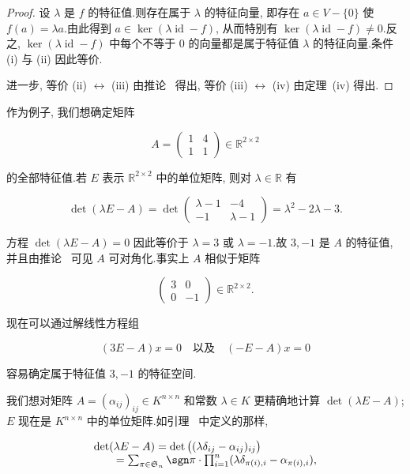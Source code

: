 \begin{proof}
设 $\lambda$ 是 $f$ 的特征值.则存在属于 $\lambda$ 的特征向量, 即存在 $a \in V - \{0\}$ 使 $f(a) = \lambda a$.由此得到 $a \in \ker(\lambda \operatorname{id} - f)$, 从而特别有 $\ker(\lambda \operatorname{id} - f) \neq 0$.反之, $\ker(\lambda \operatorname{id} - f)$ 中每个不等于 $0$ 的向量都是属于特征值 $\lambda$ 的特征向量.条件 (i) 与 (ii) 因此等价.

进一步, 等价 (ii) $\longleftrightarrow$ (iii) 由推论~ 得出, 等价 (iii) $\longleftrightarrow$ (iv) 由定理~(iv) 得出.
\end{proof}

作为例子, 我们想确定矩阵

\[
A = \left(\begin{array}{cc} 1 & 4 \\ 1 & 1 \end{array}\right) \in \mathbb{R}^{2 \times 2}\]

的全部特征值.若 $E$ 表示 $\mathbb{R}^{2 \times 2}$ 中的单位矩阵, 则对 $\lambda \in \mathbb{R}$ 有

\[
\det(\lambda E - A) = \det\left(\begin{array}{cc} \lambda - 1 & -4 \\ -1 & \lambda - 1 \end{array}\right) = \lambda^2 - 2\lambda - 3\text{.}\]

方程 $\det(\lambda E - A) = 0$ 因此等价于 $\lambda = 3$ 或 $\lambda = -1$.故 $3, -1$ 是 $A$ 的特征值, 并且由推论~ 可见 $A$ 可对角化.事实上 $A$ 相似于矩阵

\[
\left(\begin{array}{cc} 3 & 0 \\ 0 & -1 \end{array}\right) \in \mathbb{R}^{2 \times 2}\text{.}\]

现在可以通过解线性方程组

\[
(3E - A)x = 0 \quad \text{以及} \quad (-E - A)x = 0\]

容易确定属于特征值 $3, -1$ 的特征空间.

我们想对矩阵 $A = (\alpha_{ij})_{ij} \in K^{n \times n}$ 和常数 $\lambda \in K$ 更精确地计算 $\det(\lambda E - A)$; $E$ 现在是 $K^{n \times n}$ 中的单位矩阵.如引理~ 中定义的那样,

\[
\begin{array}{l}
\det(\lambda E - A) = \det\big((\lambda \delta_{ij} - \alpha_{ij})_{ij}\big) \\
\qquad = \sum_{\pi \in \mathfrak{S}_n} \sgn \pi \cdot \prod_{i = 1}^{n} (\lambda \delta_{\pi(i), i} - \alpha_{\pi(i), i}),
\end{array}\]

